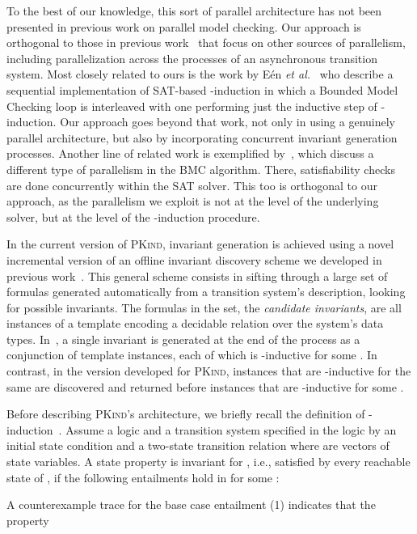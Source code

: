\documentclass[submission,copyright,creativecommons]{eptcs}
\newcommand{\define}[1]{\emph{#1}}
\newcommand{\PKind}{\textrm{\textsc{PKind}}\xspace}
\begin{document}
To the best of our knowledge, this sort of parallel architecture has
not been presented in previous work on parallel model checking. Our
approach is orthogonal to those in previous work~\cite{BBCR10b} that
focus on other sources of parallelism, including parallelization
across the processes of an asynchronous transition system. Most
closely related to ours is the work by E{\'e}n \textit{et
  al.}~\cite{ES2003} who describe a sequential implementation of
SAT-based -induction in which a Bounded Model Checking 
loop is interleaved with one
performing just the inductive step of -induction.
Our approach goes beyond that work, not only in using a genuinely
parallel architecture, but also by incorporating concurrent invariant
generation processes. Another line of
related
work is exemplified
by~\cite{Erika07,tarmo09,Bradley11}, which discuss a different type of
parallelism in the BMC algorithm. There, satisfiability checks are
done concurrently within the SAT solver. This too is
orthogonal
to our approach, as the parallelism we exploit is not at the level of
the underlying solver, but at the level of the -induction procedure.

In the current version of \PKind, invariant generation is achieved
using a novel incremental version of an offline invariant discovery
scheme we developed in previous work~\cite{Kahsai-Ge-Tinelli-10}. This
general scheme consists in sifting through a large set of formulas
generated automatically from a transition system's description,
looking for possible invariants.  The formulas in the set, the
\define{candidate invariants}, are all instances of a template encoding a
decidable relation over the system's data
types. In~\cite{Kahsai-Ge-Tinelli-10}, a single invariant is generated
at the end of the process as a conjunction of template instances, each
of which is -inductive for some .  In contrast, in the version
developed for \PKind, instances that are -inductive for the same
 are discovered and returned before instances that are
-inductive for some .

Before describing \PKind's architecture, 
we briefly recall the definition of -induction~\cite{She00}.
Assume a logic  and a transition system  specified in the logic
by an initial state condition  and a two-state transition 
relation 
where  are vectors of state variables.
A state property  is invariant for ,
i.e., satisfied by every reachable state of ,
if the following entailments hold in  for some :

A counterexample trace for the base case entailment (1) indicates that 
the property 
 
\end{document}
